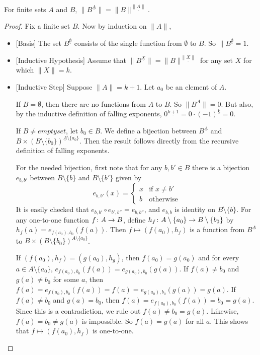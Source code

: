 \begin{lemma}
	For finite sets $A$ and $B$, $\lVert B^{\underline A}\rVert = \lVert B\rVert^{\underline{\lVert A\rVert}}$.
	
	\begin{proof}
		Fix a finite set $B$. 
		Now by induction on $\lVert A\rVert$,
		\begin{itemize}
			\item{}[Basis] The set $B^{\underline \emptyset}$ consists of the single function from $\emptyset$ to $B$. 
			So $\lVert B^{\underline{\emptyset}} = 1$.
			\item{}[Inductive Hypothesis] Assume that $\lVert B^{\underline X}\rVert = \lVert B\rVert^{\underline{\lVert X\rVert}}$ for any set $X$ for which $\lVert X\rVert = k$.
			\item{}[Inductive Step] Suppose $\lVert A\rVert = k+1$.
			Let $a_0$ be an element of $A$. 
			
			If $B=\emptyset$, then there are no functions from $A$ to $B$.
			So $\lVert B^{\underline A}\rVert = 0$. 
			But also, by the inductive definition of falling exponents, $0^{\underline{k+1}} = 0\cdot (-1)^{\underline k} = 0$.
			
			If $B\neq emptyset$, let $b_0\in B$. 
			We define a bijection between $B^{\underline A}$ and $B\times (B\setminus\{b_0\})^{\underline A\setminus\{a_0\}}$. 
			Then the result follows directly from the recursive definition of falling exponents.
			
			For the needed bijection, first note that for any $b,b'\in B$ there is a bijection $e_{b,b'}$ between $B\setminus\{b\}$ and $B\setminus\{b'\}$ given by 
			\[e_{b,b'}(x) = \begin{cases}
			x & \text{if $x\neq b'$}\\
			b & \text{otherwise}
			\end{cases}
			\]
			It is easily checked that $e_{b,b'}\circ e_{b',b''} = e_{b,b''}$, 
			and $e_{b,b}$ is identity on $B\setminus\{b\}$.
			For any one-to-one function ${f}\colon{A}\to{B}$, 
			define ${h_f}\colon{A\setminus\{a_0\}}\to{B\setminus\{b_0\}}$ by
			$h_f(a) = e_{f(a_0),b_0}(f(a))$. Then $f\mapsto (f(a_0),h_f)$ is a function
			from $B^{\underline A}$ to $B\times (B\setminus\{b_0\})^{\underline{A\setminus\{a_0\}}}$.
			
			If $(f(a_0),h_f) = (g(a_0), h_g)$, then $f(a_0)=g(a_0)$ and for every $a\in A\setminus\{a_0\}$, $e_{f(a_0),b_0}(f(a)) = e_{g(a_0),b_0}(g(a))$.
			If $f(a)\neq b_0$ and $g(a)\neq b_0$ for some $a$, then $f(a)=e_{f(a_0),b_0}(f(a))=f(a) = e_{g(a_0),b_0}(g(a)) = g(a)$.
			If $f(a)\neq b_0$ and $g(a) = b_0$, then $f(a)= e_{f(a_0), b_0}(f(a)) = b_0 = g(a)$. 
			Since this is a contradiction, we rule out $f(a)\neq b_0 = g(a)$. Likewise, $f(a)=b_0\neq g(a)$ is impossible. 
			So $f(a)=g(a)$ for all $a$. This shows that $f\mapsto (f(a_0),h_f)$ is one-to-one. 
			

\end{itemize}
\end{proof}
\end{lemma}
